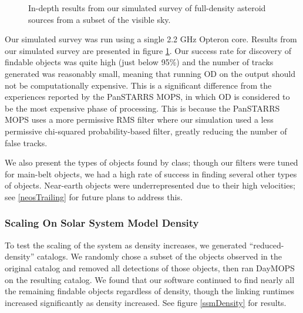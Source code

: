 \documentclass[12pt,preprint]{aastex}
\begin{document}
\begin{figure}[ht!]
\caption{In-depth results from our simulated survey of full-density asteroid sources from a subset of the visible sky.}
\label{bigSimResults}
\end{figure}

Our simulated survey was run using a single 2.2 GHz Opteron core.
Results from our simulated survey are presented in figure
\ref{bigSimResults}.  Our success rate for discovery of findable
objects was quite high (just below 95\%) and the number of tracks
generated was reasonably small, meaning that running OD on the output
should not be computationally expensive.  This is a significant
difference from the experiences reported by the PanSTARRS MOPS, in
which OD is considered to be the most expensive phase of processing.
This is because the PanSTARRS MOPS uses a more permissive RMS filter
where our simulation used a less permissive chi-squared
probability-based filter, greatly reducing the number of false tracks.

We also present the types of objects found by class; though our
filters were tuned for main-belt objects, we had a high rate of
success in finding several other types of objects.  Near-earth objects
were underrepresented due to their high velocities; see
\ref{neosTrailing} for future plans to address this.



\subsubsection{Scaling On Solar System Model Density}

To test the scaling of the system as density increases, we generated
``reduced-density'' catalogs.  We randomly chose a subset of the
objects observed in the original catalog and removed all detections of
those objects, then ran DayMOPS on the resulting catalog.  We found
that our software continued to find nearly all the remaining findable
objects regardless of density, though the linking runtimes increased
significantly as density increased. See figure \ref{ssmDensity} for
results.
\end{document}
